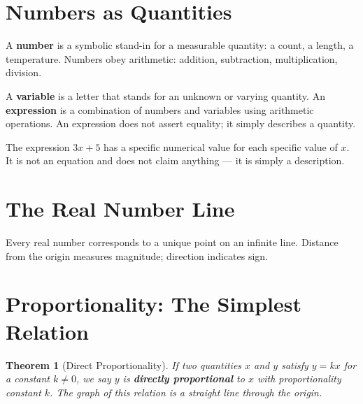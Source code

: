 \documentclass[11pt, openany]{book}
\theoremstyle{plain}
\newtheorem{theorem}{Theorem}[chapter]
\theoremstyle{definition}
\theoremstyle{remark}
\newcommand{\R}{\mathbb{R}}
\begin{document}
\section{Numbers as Quantities}

A \textbf{number} is a symbolic stand-in for a measurable quantity: a count, a
length, a temperature. Numbers obey arithmetic: addition, subtraction,
multiplication, division.

\begin{mydefinition}[Variable]
A \textbf{variable} is a letter that stands for an unknown or varying quantity.
An \textbf{expression} is a combination of numbers and variables using
arithmetic operations. An expression does not assert equality; it simply
describes a quantity.
\end{mydefinition}

The expression $3x+5$ has a specific numerical value for each specific value
of $x$. It is not an equation and does not claim anything --- it is simply a
description.

\section{The Real Number Line}

Every real number corresponds to a unique point on an infinite line. Distance
from the origin measures magnitude; direction indicates sign.

\begin{center}
\end{center}

\section{Proportionality: The Simplest Relation}

\begin{theorem}[Direct Proportionality]
If two quantities $x$ and $y$ satisfy $y=kx$ for a constant $k\ne0$, we say
$y$ is \textbf{directly proportional} to $x$ with proportionality constant $k$.
The graph of this relation is a straight line through the origin.
\end{theorem}
\end{document}

